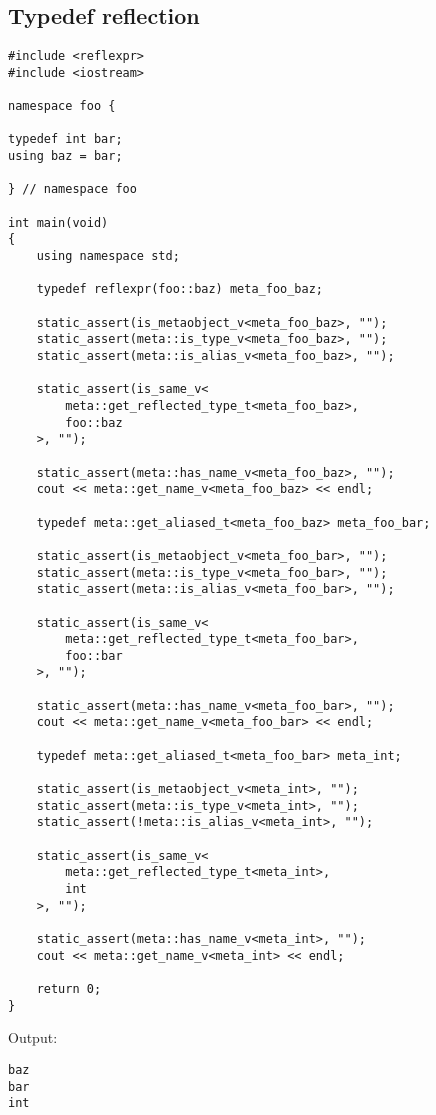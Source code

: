 \subsection{Typedef reflection}

\begin{verbatim}
#include <reflexpr>
#include <iostream>

namespace foo {

typedef int bar;
using baz = bar;

} // namespace foo

int main(void)
{
	using namespace std;

	typedef reflexpr(foo::baz) meta_foo_baz;

	static_assert(is_metaobject_v<meta_foo_baz>, "");
	static_assert(meta::is_type_v<meta_foo_baz>, "");
	static_assert(meta::is_alias_v<meta_foo_baz>, "");

	static_assert(is_same_v<
		meta::get_reflected_type_t<meta_foo_baz>,
		foo::baz
	>, "");

	static_assert(meta::has_name_v<meta_foo_baz>, "");
	cout << meta::get_name_v<meta_foo_baz> << endl;

	typedef meta::get_aliased_t<meta_foo_baz> meta_foo_bar;

	static_assert(is_metaobject_v<meta_foo_bar>, "");
	static_assert(meta::is_type_v<meta_foo_bar>, "");
	static_assert(meta::is_alias_v<meta_foo_bar>, "");

	static_assert(is_same_v<
		meta::get_reflected_type_t<meta_foo_bar>,
		foo::bar
	>, "");

	static_assert(meta::has_name_v<meta_foo_bar>, "");
	cout << meta::get_name_v<meta_foo_bar> << endl;

	typedef meta::get_aliased_t<meta_foo_bar> meta_int;

	static_assert(is_metaobject_v<meta_int>, "");
	static_assert(meta::is_type_v<meta_int>, "");
	static_assert(!meta::is_alias_v<meta_int>, "");

	static_assert(is_same_v<
		meta::get_reflected_type_t<meta_int>,
		int
	>, "");

	static_assert(meta::has_name_v<meta_int>, "");
	cout << meta::get_name_v<meta_int> << endl;

	return 0;
}

\end{verbatim}

Output:

\begin{verbatim}
baz
bar
int
\end{verbatim}

